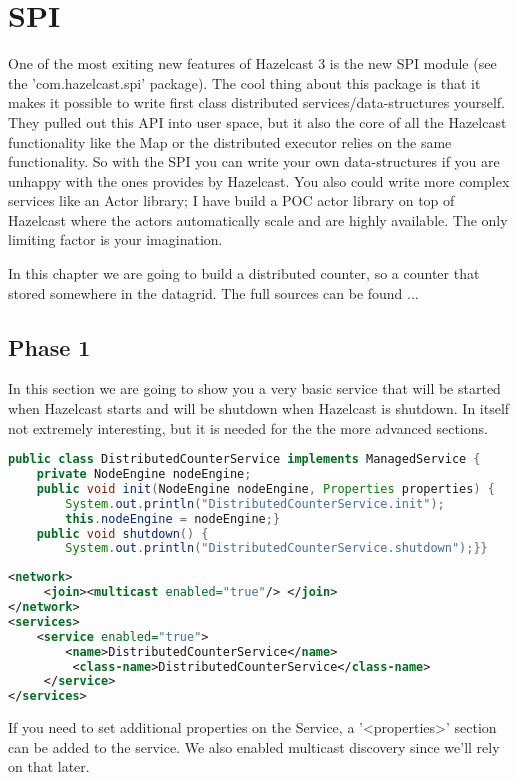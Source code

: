 \chapter{SPI}

One of the most exiting new features of Hazelcast 3 is the new SPI module (see the 'com.hazelcast.spi' package). The cool thing about this package is that it makes it possible to write first class distributed services/data-structures yourself. They pulled out this API into user space, but it also the core of all the Hazelcast functionality like the Map or the distributed executor relies on the same functionality. So with the SPI you can write your own data-structures if you are unhappy with the ones provides by Hazelcast. You also could write more complex services like an Actor library; I have build a POC actor library on top of Hazelcast where the actors automatically scale and are highly available. The only limiting factor is your imagination.

In this chapter we are going to build a distributed counter, so a counter that stored somewhere in the datagrid. The full sources can be found ...

\section{Phase 1}
In this section we are going to show you a very basic service that will be started when Hazelcast starts and will be shutdown when Hazelcast is shutdown. In itself not extremely interesting, but it is needed for the the more advanced sections.

\begin{lstlisting}[language=java]
public class DistributedCounterService implements ManagedService {
    private NodeEngine nodeEngine;
    public void init(NodeEngine nodeEngine, Properties properties) {
        System.out.println("DistributedCounterService.init");
        this.nodeEngine = nodeEngine;}
    public void shutdown() {
        System.out.println("DistributedCounterService.shutdown");}}
\end{lstlisting}

\begin{lstlisting}[language=xml]
<network>
     <join><multicast enabled="true"/> </join>
</network>
<services>
    <service enabled="true">
        <name>DistributedCounterService</name>
         <class-name>DistributedCounterService</class-name>
     </service>
</services>
\end{lstlisting}
If you need to set additional properties on the Service, a '<properties>' section can be added to the service. We also enabled multicast discovery since we'll rely on that later.

